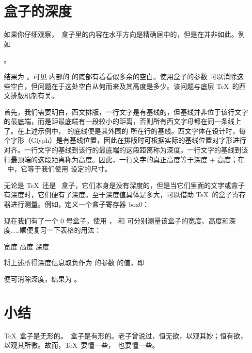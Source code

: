 \section{盒子的深度}

如果你仔细观察，\ConTeXt\ 盒子里的内容在水平方向是精确居中的，但是在并非如此。例如

\starttyping[option=TEX]
。
\stoptyping

\noindent 结果为 。可见 \type{\inframed} 内部的 \type{\framed} 的底部有着看似多余的空白。使用盒子的参数  可以消除这些空白，但问题在于这处空白从何而来及其高度是多少。该问题与底层 \TeX\ 的西文排版机制有关。

首先，我们需要明白，西文排版，一行文字是有基线的，但基线并非位于该行文字的最底端，而是距最底端有一段较小的距离，否则所有西文字母都在同一条线上了。在上述示例中，\type{\framed} 的底线便是其外围的 \type{\inframed} 所在行的基线。西文字体在设计时，每个字形（Glyph）是有基线位置，因此在排版时可根据实际的基线位置对字形进行对齐。一行文字的基线到该行的最底端的这段距离称为深度。一行文字的基线到该行最顶端的这段距离称为高度。因此，一行文字的真正高度等于深度 + 高度；在 \ConTeXt\ 中，它等于我们使用 \type{\setupinterlinespace} 设定的尺寸。

无论是 \TeX\ 还是 \ConTeXt\ 盒子，它们本身是没有深度的，但是当它们里面的文字或盒子有深度时，它们便有了深度。至于深度值具体是多大，可以借助 \TeX\ 的盒子寄存器进行测量。例如，定义一个盒子寄存器 box0：

\starttyping[option=TEX]
\hbox{}
\stoptyping
{}\hbox{}

\noindent 现在我们有了一个 0 号盒子，使用 \type{\wd}，\type{\ht} 和 \type{\dp} 可分别测量该盒子的宽度、高度和深度……顺便复习一下表格的用法：

\startsample
\starttabulate[|c|c|c|]
\HL
\NC 宽度 \NC 高度 \NC 深度 \NC\NR
\HL
\NC \the{} \NC \the{} \NC \the{} \NC\NR
\HL
\stoptabulate
\stopsample
\simplesample[option=TEX]{\getsample}

将上述所得深度信息取负作为 \type{\inframed} 的参数  的值，即

\starttyping[option=TEX]
\stoptyping

\noindent 便可消除深度，结果为 。

\section{小结}

\TeX\ 盒子是无形的。\ConTeXt\ 盒子是有形的。老子曾说过，恒无欲，以观其妙；恒有欲，以观其所徼。故而，\TeX\ 要懂一些，\ConTeXt\ 也要懂一些。
